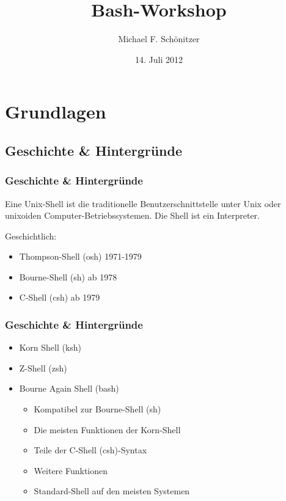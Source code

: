 \documentclass{beamer}
\title{Bash-Workshop}
\author{Michael F. Schönitzer}
\date{14. Juli 2012}
\begin{document}
\maketitle
 
\tableofcontents

\section{Grundlagen}

\subsection{Geschichte \& Hintergründe}
\begin{frame} %
  \frametitle{Geschichte \& Hintergründe} %
  \begin{Definition} %
    Eine Unix-Shell ist die traditionelle Benutzerschnittstelle unter Unix oder unixoiden Computer-Betriebssystemen. Die Shell ist ein Interpreter.
  \end{Definition}
  Geschichtlich:
  \begin{itemize}
   \item Thompson-Shell (osh) 1971-1979 
   \item Bourne-Shell (sh) ab 1978
   \item C-Shell (csh) ab 1979
  \end{itemize}
  
\end{frame}

\begin{frame}
  \frametitle{Geschichte \& Hintergründe} %
  
  \begin{itemize}
   \item Korn Shell (ksh)
   \item Z-Shell (zsh)
   \item Bourne Again Shell (bash)
   \begin{itemize}
    \item Kompatibel zur Bourne-Shell (sh)
    \item Die meisten Funktionen der Korn-Shell
    \item Teile der C-Shell (csh)-Syntax
    \item Weitere Funktionen
    \item Standard-Shell auf den meisten Systemen
   \end{itemize}
  \end{itemize}
\end{frame}
\end{document}
